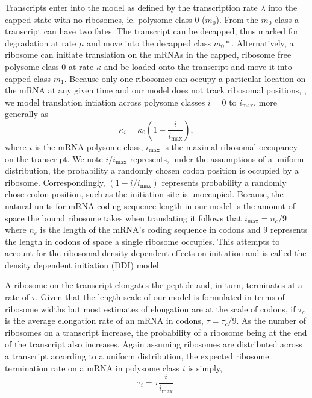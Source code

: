 \documentclass[review]{elsarticle}
\newcommand{\imax}{\ensuremath{{i_{\max}}}\xspace}
\begin{document}
Transcripts enter into the model as defined by the transcription rate $\lambda$ into the capped state with no ribosomes,  ie. polysome class 0 ($m_0$). 
From the $m_0$ class a transcript can have two fates. 
The transcript can be decapped, thus marked for degradation at rate $\mu$ and move into the decapped class $m_0*$.
Alternatively, a ribosome can initiate translation on the mRNAs in the capped, ribosome free polysome class 0 at rate $\kappa$ and be loaded onto the transcript and move it into capped class $m_1$.
Because only one ribosomes can occupy a particular location on the mRNA at any given time and our model does not track ribosomal positions,
, we model translation intiation across polysome classes $i = 0$ to $\imax$, more generally as
\begin{equation}
  \label{eq:kappa_i}
  \kappa_i = \kappa_0 \left(1- \frac{i}{\imax}\right),
\end{equation}
where $i$ is the mRNA polysome class, \imax is the maximal ribosomal occupancy on the transcript.
We note $i/\imax$ represents, under the assumptions of a uniform distribution,  the probability a randomly chosen codon position is occupied by a ribosome.
Correspondingly, $(1 - i/\imax)$ represents probability a randomly chose codon position, such as the initiation site is unoccupied.
Because, the natural units for mRNA coding sequence length in our model is the amount of space the bound ribosome takes when translating it follows that $\imax = n_{c}/9$ where $n_{c}$ is the length of the mRNA's coding sequence in codons and 9 represents the length in codons of space a single ribosome occupies.
This attempts to account for the ribosomal density dependent effects on initiation and is called the density dependent initiation (DDI) model.


A ribosome on the transcript elongates the peptide and, in turn, terminates at a rate of $\tau$, 
Given that the length scale of our model is formulated in terms of ribosome widths but most estimates of elongation are at the scale of codons, if $\tau_c$ is the average elongation rate of an mRNA in codons, $\tau = \tau_c/9$.
As the number of ribosomes on a transcript increase, the probability of a ribosome being at the end of the transcript also increases.
Again assuming ribosomes are distributed across a transcript according to a uniform distribution, the expected ribosome termination rate on a mRNA in polysome class $i$ is simply, 
\begin{equation}
	\tau_i = \tau \frac{i}{\imax}.
\end{equation}
\end{document}
